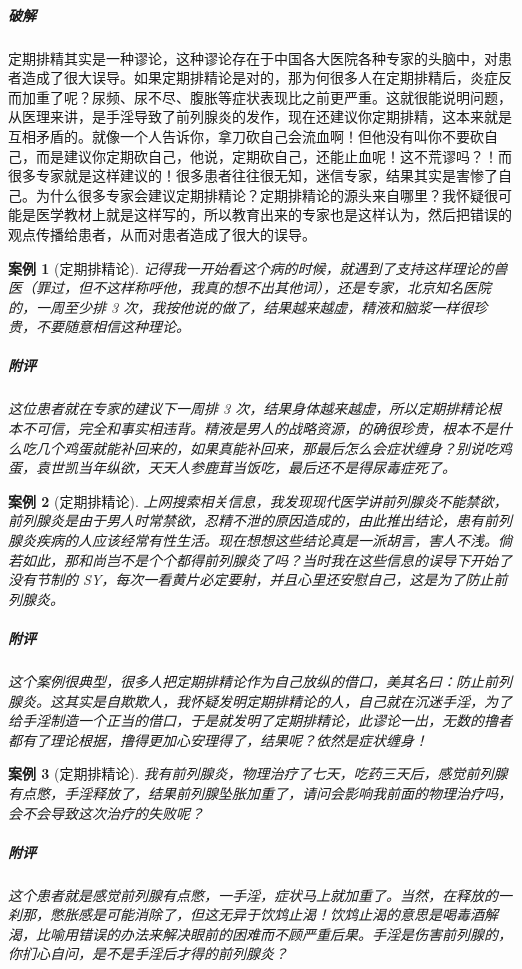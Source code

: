 \documentclass{ctexart}
\newtheorem{case}{案例}
\begin{document}
\subparagraph{破解} 定期排精其实是一种谬论，这种谬论存在于中国各大医院各种专家的头脑中，对患者造成了很大误导。如果定期排精论是对的，那为何很多人在定期排精后，炎症反而加重了呢？尿频、尿不尽、腹胀等症状表现比之前更严重。这就很能说明问题，从医理来讲，是手淫导致了前列腺炎的发作，现在还建议你定期排精，这本来就是互相矛盾的。就像一个人告诉你，拿刀砍自己会流血啊！但他没有叫你不要砍自己，而是建议你定期砍自己，他说，定期砍自己，还能止血呢！这不荒谬吗？！而很多专家就是这样建议的！很多患者往往很无知，迷信专家，结果其实是害惨了自己。为什么很多专家会建议定期排精论？定期排精论的源头来自哪里？我怀疑很可能是医学教材上就是这样写的，所以教育出来的专家也是这样认为，然后把错误的观点传播给患者，从而对患者造成了很大的误导。

\begin{case}[定期排精论]
    记得我一开始看这个病的时候，就遇到了支持这样理论的兽医（罪过，但不这样称呼他，我真的想不出其他词），还是专家，北京知名医院的，一周至少排 3 次，我按他说的做了，结果越来越虚，精液和脑浆一样很珍贵，不要随意相信这种理论。
    \subparagraph{附评} 这位患者就在专家的建议下一周排 3 次，结果身体越来越虚，所以定期排精论根本不可信，完全和事实相违背。精液是男人的战略资源，的确很珍贵，根本不是什么吃几个鸡蛋就能补回来的，如果真能补回来，那最后怎么会症状缠身？别说吃鸡蛋，袁世凯当年纵欲，天天人参鹿茸当饭吃，最后还不是得尿毒症死了。
\end{case}

\begin{case}[定期排精论]\label{DingqiPaijingLunJinyuWuhai}
    上网搜索相关信息，我发现现代医学讲前列腺炎不能禁欲，前列腺炎是由于男人时常禁欲，忍精不泄的原因造成的，由此推出结论，患有前列腺炎疾病的人应该经常有性生活。现在想想这些结论真是一派胡言，害人不浅。倘若如此，那和尚岂不是个个都得前列腺炎了吗？当时我在这些信息的误导下开始了没有节制的 SY，每次一看黄片必定要射，并且心里还安慰自己，这是为了防止前列腺炎。
    \subparagraph{附评} 这个案例很典型，很多人把定期排精论作为自己放纵的借口，美其名曰：防止前列腺炎。这其实是自欺欺人，我怀疑发明定期排精论的人，自己就在沉迷手淫，为了给手淫制造一个正当的借口，于是就发明了定期排精论，此谬论一出，无数的撸者都有了理论根据，撸得更加心安理得了，结果呢？依然是症状缠身！
\end{case}

\begin{case}[定期排精论]
    我有前列腺炎，物理治疗了七天，吃药三天后，感觉前列腺有点憋，手淫释放了，结果前列腺坠胀加重了，请问会影响我前面的物理治疗吗，会不会导致这次治疗的失败呢？
    \subparagraph{附评} 这个患者就是感觉前列腺有点憋，一手淫，症状马上就加重了。当然，在释放的一刹那，憋胀感是可能消除了，但这无异于饮鸩止渴！饮鸩止渴的意思是喝毒酒解渴，比喻用错误的办法来解决眼前的困难而不顾严重后果。手淫是伤害前列腺的，你扪心自问，是不是手淫后才得的前列腺炎？
\end{case}
\end{document}

